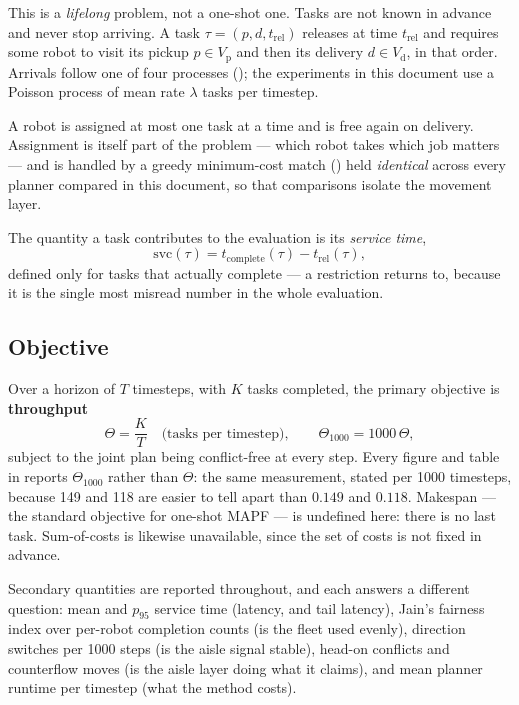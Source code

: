 This is a \emph{lifelong} problem, not a one-shot one. Tasks are not known in
advance and never stop arriving. A task $\tau = (p, d, t_{\mathrm{rel}})$
releases at time $t_{\mathrm{rel}}$ and requires some robot to visit its pickup
$p \in V_{\mathrm{p}}$ and then its delivery $d \in V_{\mathrm{d}}$, in that
order. Arrivals follow one of four processes (); the
experiments in this document use a Poisson process of mean rate $\lambda$
tasks per timestep.

A robot is assigned at most one task at a time and is free again on delivery.
Assignment is itself part of the problem --- which robot takes which job
matters --- and is handled by a greedy minimum-cost match
() held \emph{identical} across every planner compared in
this document, so that comparisons isolate the movement layer.

The quantity a task contributes to the evaluation is its \emph{service time},
\begin{equation}
  \mathrm{svc}(\tau) = t_{\mathrm{complete}}(\tau) - t_{\mathrm{rel}}(\tau),
\end{equation}
defined only for tasks that actually complete --- a restriction
 returns to, because it is the single most misread number in
the whole evaluation.

\subsection{Objective}

Over a horizon of $T$ timesteps, with $K$ tasks completed, the primary
objective is \textbf{throughput}
\begin{equation}
  \Theta = \frac{K}{T} \quad \text{(tasks per timestep)},
  \qquad
  \Theta_{1000} = 1000\,\Theta,
  \label{eq:throughput}
\end{equation}
subject to the joint plan being conflict-free at every step. Every figure and
table in  reports $\Theta_{1000}$ rather than $\Theta$: the
same measurement, stated per 1000 timesteps, because 149 and 118 are easier to
tell apart than $0.149$ and $0.118$. Makespan --- the
standard objective for one-shot MAPF --- is undefined here: there is no last
task. Sum-of-costs is likewise unavailable, since the set of costs is not
fixed in advance.

Secondary quantities are reported throughout, and each answers a different
question: mean and $p_{95}$ service time (latency, and tail latency),
Jain's fairness index over per-robot completion counts (is the fleet used
evenly), direction switches per 1000 steps (is the aisle signal stable),
head-on conflicts and counterflow moves (is the aisle layer doing what it
claims), and mean planner runtime per timestep (what the method costs).

